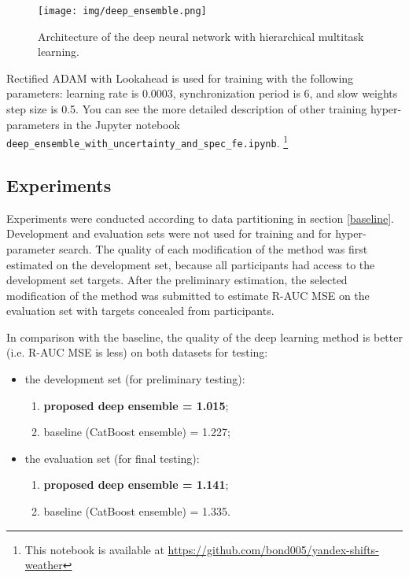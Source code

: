 \documentclass{article}
\begin{document}
\begin{figure*}[hbt!]
 \centering
\begin{minipage}[h]{0.9\linewidth}
  \centering
  \centerline{\texttt{[image: img/deep\_ensemble.png]}}
  \vspace{-0.1cm}
\end{minipage}
 \caption{Architecture of the deep neural network with hierarchical multitask learning.}
 \label{fig:nn-architecture}
\end{figure*}

Rectified ADAM \cite{Liu2020OnTV} with Lookahead \cite{Zhang2019LookaheadOK} is used for training with the following parameters: learning rate is 0.0003, synchronization period is 6, and slow weights step size is 0.5. You can see the more detailed description of other training hyper-parameters in the Jupyter notebook \texttt{deep\_ensemble\_with\_uncertainty\_and\_spec\_fe.ipynb}. \footnote{This notebook is available at \url{https://github.com/bond005/yandex-shifts-weather}}

\subsection{Experiments}

Experiments were conducted according to data partitioning in section \ref{baseline}. Development and evaluation sets were not used for training and for hyper-parameter search. The quality of each modification of the method was first estimated on the development set, because all participants had access to the development set targets. After the preliminary estimation, the selected modification of the method was submitted to estimate R-AUC MSE on the evaluation set with targets concealed from participants.

In comparison with the baseline, the quality of the deep learning method is better (i.e. R-AUC MSE is less) on both datasets for testing:

\begin{itemize}
    \item the development set (for preliminary testing):
        \begin{enumerate}
            \item \textbf{proposed deep ensemble = 1.015};
            \item baseline (CatBoost ensemble) = 1.227;
        \end{enumerate}
    \item the evaluation set (for final testing):
        \begin{enumerate}
            \item \textbf{proposed deep ensemble = 1.141};
            \item baseline (CatBoost ensemble) = 1.335.
        \end{enumerate}
\end{itemize}
\end{document}

